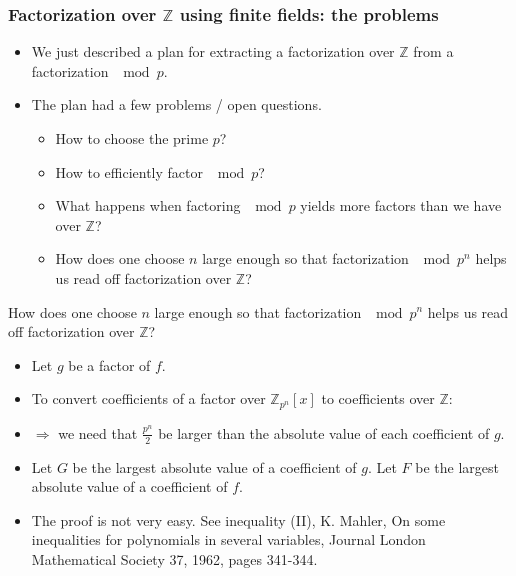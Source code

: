 \begin{frame}
\frametitle{Factorization over $\mathbb Z$ using finite fields: the problems}
\begin{itemize}
\item We just described a plan for extracting a factorization over $\mathbb Z$ from a factorization $\mod p$.
\item The plan had a few problems / open questions.
\begin{itemize}
\item How to choose the prime $p$?
\item How to efficiently factor $\mod p$? 
\item What happens when factoring $\mod p$ yields more factors than we have over $\mathbb Z$?
\item \alert<1->{How does one choose $n$ large enough so that factorization $\mod p^n$ helps us read off factorization over $\mathbb Z$?}
\end{itemize}
\end{itemize}
\end{frame}


\begin{frame}
\begin{question}
How does one choose $n$ large enough so that factorization $\mod p^n$ helps us read off factorization over $\mathbb Z$?
\end{question}

\begin{itemize}
\item<2-> Let $g$ be a factor of $f$. 
\item<3-> To convert coefficients of a factor over $\mathbb Z_{p^n}[x]$ to coefficients over $\mathbb Z$:
\item<4-> $\Rightarrow$ we need that $\frac{p^n}{2}$ be larger than the absolute value of each coefficient of $g $.
\item<5-> Let $G$ be the largest absolute value of a coefficient of $g$. Let $F$ be the largest absolute value of a coefficient of $f$.
\item<7-> The proof is not very easy. See inequality (II), K. Mahler, On some inequalities for polynomials in several variables, Journal London Mathematical Society 37, 1962, pages 341-344.
\end{itemize}

\end{frame}
